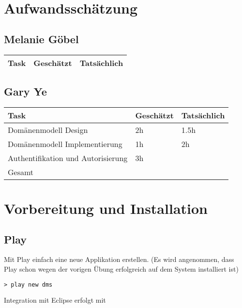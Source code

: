 \documentclass[11pt, a4paper]{article}
\begin{document}
\section{Aufwandsschätzung}

\subsection*{Melanie Göbel}
\begin{center}
  \begin{tabular}{| l | l | l |}
    \hline
    Task & Geschätzt & Tatsächlich \\ \hline
    
  \end{tabular}
\end{center}


\subsection*{Gary Ye}
\begin{center}
  \begin{tabular}{| l | l | l |}
    \hline
    Task & Geschätzt & Tatsächlich \\ \hline
    Domänenmodell Design & 2h & 1.5h \\ \hline
		Domänenmodell Implementierung & 1h & 2h \\ \hline
    Authentifikation und Autorisierung & 3h & \\ \hline
		Gesamt & & \\ \hline
  \end{tabular}
\end{center}

\section{Vorbereitung und Installation}

\subsection{Play}

Mit Play einfach eine neue Applikation erstellen. (Es wird angenommen, dass Play schon wegen der vorigen Übung erfolgreich auf dem System installiert ist)

\begin{lstlisting}
> play new dms
\end{lstlisting}

Integration mit Eclipse erfolgt mit 
\end{document}
